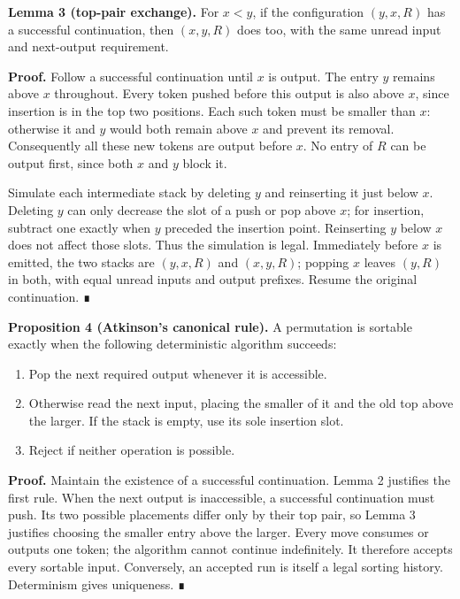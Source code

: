 \documentclass[11pt,letterpaper]{article}
\providecommand{\tightlist}{\setlength{\itemsep}{0pt}\setlength{\parskip}{0pt}}
\begin{document}
\textbf{Lemma 3 (top-pair exchange).} For \(x<y\), if the configuration
\((y,x,R)\) has a successful continuation, then \((x,y,R)\) does too,
with the same unread input and next-output requirement.

\textbf{Proof.} Follow a successful continuation until \(x\) is output.
The entry \(y\) remains above \(x\) throughout. Every token pushed
before this output is also above \(x\), since insertion is in the top
two positions. Each such token must be smaller than \(x\): otherwise it
and \(y\) would both remain above \(x\) and prevent its removal.
Consequently all these new tokens are output before \(x\). No entry of
\(R\) can be output first, since both \(x\) and \(y\) block it.

Simulate each intermediate stack by deleting \(y\) and reinserting it
just below \(x\). Deleting \(y\) can only decrease the slot of a push or
pop above \(x\); for insertion, subtract one exactly when \(y\) preceded
the insertion point. Reinserting \(y\) below \(x\) does not affect those
slots. Thus the simulation is legal. Immediately before \(x\) is
emitted, the two stacks are \((y,x,R)\) and \((x,y,R)\); popping \(x\)
leaves \((y,R)\) in both, with equal unread inputs and output prefixes.
Resume the original continuation. ∎

\textbf{Proposition 4 (Atkinson's canonical rule).} A permutation is
sortable exactly when the following deterministic algorithm succeeds:

\begin{enumerate}
\def\labelenumi{\arabic{enumi}.}
\tightlist
\item
  Pop the next required output whenever it is accessible.
\item
  Otherwise read the next input, placing the smaller of it and the old
  top above the larger. If the stack is empty, use its sole insertion
  slot.
\item
  Reject if neither operation is possible.
\end{enumerate}

\textbf{Proof.} Maintain the existence of a successful continuation.
Lemma 2 justifies the first rule. When the next output is inaccessible,
a successful continuation must push. Its two possible placements differ
only by their top pair, so Lemma 3 justifies choosing the smaller entry
above the larger. Every move consumes or outputs one token; the
algorithm cannot continue indefinitely. It therefore accepts every
sortable input. Conversely, an accepted run is itself a legal sorting
history. Determinism gives uniqueness. ∎
\end{document}
